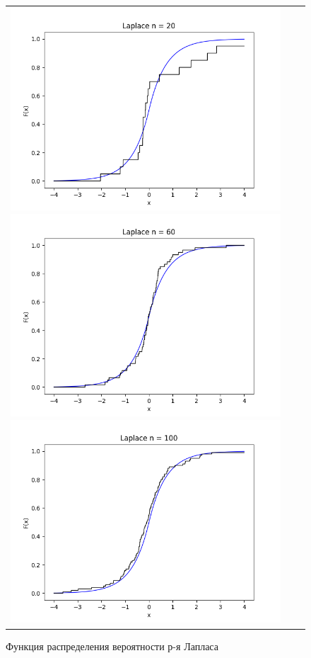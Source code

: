 \begin{figure}[H]
	\begin{tabular}{ccc}
		\includegraphics[scale=0.33]{laplace_F20.png}
		\includegraphics[scale=0.33]{laplace_F60.png}
		\includegraphics[scale=0.33]{laplace_F100.png}
	\end{tabular}
	\caption{Функция распределения вероятности р-я Лапласа }
\end{figure}

